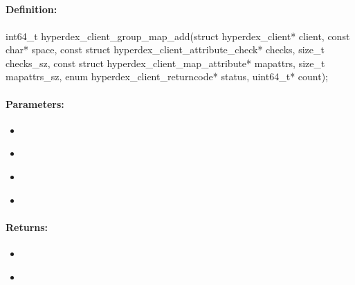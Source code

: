 \pagebreak
\subsection{}
\label{api:c:group_map_add}


\paragraph{Definition:}
\begin{ccode}
int64_t hyperdex_client_group_map_add(struct hyperdex_client* client,
        const char* space,
        const struct hyperdex_client_attribute_check* checks, size_t checks_sz,
        const struct hyperdex_client_map_attribute* mapattrs, size_t mapattrs_sz,
        enum hyperdex_client_returncode* status,
        uint64_t* count);
\end{ccode}

\paragraph{Parameters:}
\begin{itemize}[noitemsep]
\item {}\\

\item {}\\

\item {}\\

\item {}\\

\end{itemize}

\paragraph{Returns:}
\begin{itemize}[noitemsep]
\item {}\\

\item {}\\

\end{itemize}

